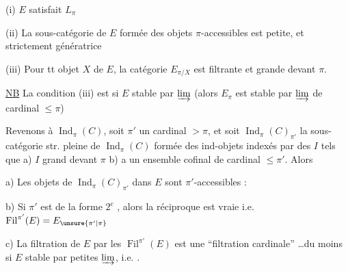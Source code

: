 (i) $E$  satisfait $L_\pi$

(ii) La sous-catégorie  de $E$ formée des objets $\pi$-accessibles est  petite, et strictement génératrice

(iii) Pour tt objet $X$ de $E$, la catégorie $E_{\pi/X}$ est filtrante et grande devant $\pi$.

\uline{NB} La condition (iii) est   si $E$ stable par  $\varinjlim$ (alors $E_\pi$ est stable par $\varinjlim$ de cardinal $\leq\pi$)

Revenons à $\operatorname{Ind}_\pi(C)$, soit $\pi'$ un cardinal $>\pi$, et soit $\operatorname{Ind}_{\pi}(C)_{\pi'}$  la sous-catégorie str. pleine de $\operatorname{Ind}_\pi(C)$ formée des ind-objets indexés par des $I$ tels que a) $I$ grand devant $\pi$ b)   a un ensemble cofinal de cardinal $\leq\pi'$. Alors

a) Les objets de $\operatorname{Ind}_\pi(C)_{\pi'}$  dans $E$ sont  $\pi'$-accessibles :

b) Si $\pi'$ est de la forme $2^c$ , alors la réciproque est vraie i.e. $\operatorname{Fil}^{\pi'}(E)=E_{\unsure{\pi'|\pi}}$

c) La filtration de $E$ par les  $\operatorname{Fil}^{\pi'}(E)$  est une ``filtration cardinale'' \ldots du moins si $E$ stable par petites $\varinjlim$, i.e. .



